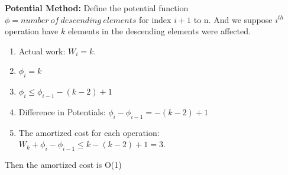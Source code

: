 \begin{homeworkProblem}
\textbf{Potential Method:} Define the potential function $\phi = number \ of \ descending  \ elements$ for index $i+1$ to n. And we suppose $i^{th}$ operation have $k$ elements in the descending elements were affected.

\begin{enumerate}
    \item Actual work: $W_i = k$.
    \item $\phi_i = k$
    \item $\phi_i \leq \phi_{i-1} - (k-2) + 1$
    \item Difference in Potentials: $\phi_i - \phi_{i-1} = - (k-2) + 1$
    \item The amortized cost for each operation: $W_k + \phi_i - \phi_{i-1} \leq k - (k-2) + 1 = 3$.
\end{enumerate}
Then the amortized cost is O(1)

\end{homeworkProblem}

\pagebreak

